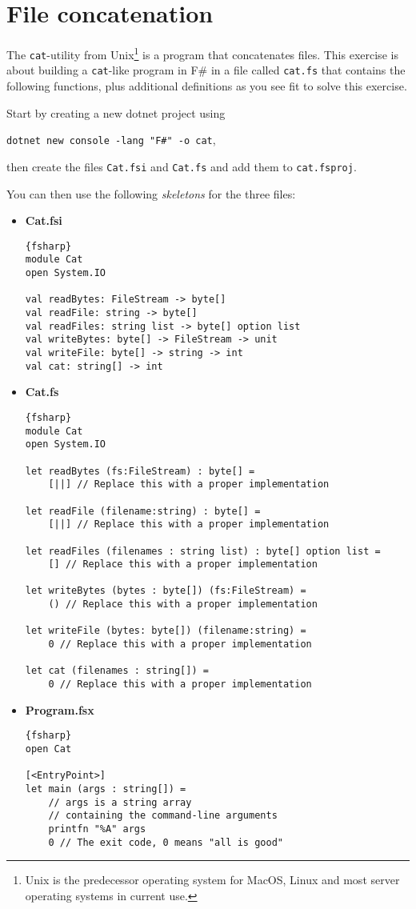 \section*{File concatenation}

The \texttt{cat}-utility from 
Unix\footnote{Unix is the predecessor operating system for MacOS, Linux and most server operating systems in current use.} 
is a program that concatenates files.  
This exercise is about building a \texttt{cat}-like program in F\# in a file called \texttt{cat.fs} that contains the following functions, plus additional definitions as you see fit to solve this exercise.

Start by creating a new dotnet project using 
\begin{center}
\texttt{dotnet new console -lang "F\#" -o cat},
\end{center} 
then create the files \texttt{Cat.fsi} and \texttt{Cat.fs} and add them to \texttt{cat.fsproj}.


You can then use the following \textit{skeletons} for the three files:

\begin{itemize}
\item \textbf{Cat.fsi} \\
  \begin{lstlisting}{fsharp}
module Cat
open System.IO

val readBytes: FileStream -> byte[]
val readFile: string -> byte[]
val readFiles: string list -> byte[] option list
val writeBytes: byte[] -> FileStream -> unit
val writeFile: byte[] -> string -> int
val cat: string[] -> int
  \end{lstlisting}
\item \textbf{Cat.fs} \\
  \begin{lstlisting}{fsharp}
module Cat
open System.IO

let readBytes (fs:FileStream) : byte[] =
    [||] // Replace this with a proper implementation

let readFile (filename:string) : byte[] =
    [||] // Replace this with a proper implementation

let readFiles (filenames : string list) : byte[] option list =
    [] // Replace this with a proper implementation

let writeBytes (bytes : byte[]) (fs:FileStream) =
    () // Replace this with a proper implementation

let writeFile (bytes: byte[]) (filename:string) =
    0 // Replace this with a proper implementation

let cat (filenames : string[]) =
    0 // Replace this with a proper implementation
  \end{lstlisting}
\item \textbf{Program.fsx} \\
  \begin{lstlisting}{fsharp}
open Cat

[<EntryPoint>]
let main (args : string[]) =
    // args is a string array
    // containing the command-line arguments
    printfn "%A" args 
    0 // The exit code, 0 means "all is good"
  \end{lstlisting}
\end{itemize}
